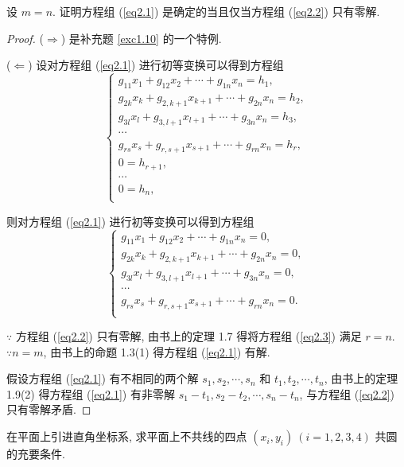 \documentclass{ctexart}
\begin{document}
\begin{exercisec}[1.11]
    设 $m=n$. 证明方程组 (\ref{eq2.1}) 是确定的当且仅当方程组 (\ref{eq2.2}) 只有零解.
\end{exercisec}
\begin{proof}
    ($\Rightarrow$) 是补充题 \ref{exc1.10} 的一个特例.

    ($\Leftarrow$) 设对方程组 (\ref{eq2.1}) 进行初等变换可以得到方程组
    \[\begin{cases}
        g_{11}x_1+g_{12}x_2+\cdots+g_{1n}x_n=h_1, \\
        g_{2k}x_k+g_{2,k+1}x_{k+1}+\cdots+g_{2n}x_n=h_2, \\
        g_{3l}x_l+g_{3,l+1}x_{l+1}+\cdots+g_{3n}x_n=h_3, \\
        \cdots \\
        g_{rs}x_s+g_{r,s+1}x_{s+1}+\cdots+g_{rn}x_n=h_r, \\
        0=h_{r+1}, \\
        \cdots \\
        0=h_n, \\
    \end{cases}\]

    则对方程组 (\ref{eq2.1}) 进行初等变换可以得到方程组
    \begin{equation}\label{eq2.3}
        \begin{cases}
            g_{11}x_1+g_{12}x_2+\cdots+g_{1n}x_n=0, \\
            g_{2k}x_k+g_{2,k+1}x_{k+1}+\cdots+g_{2n}x_n=0, \\
            g_{3l}x_l+g_{3,l+1}x_{l+1}+\cdots+g_{3n}x_n=0, \\
            \cdots \\
            g_{rs}x_s+g_{r,s+1}x_{s+1}+\cdots+g_{rn}x_n=0. \\
        \end{cases}
    \end{equation}
    
    $\because$ 方程组 (\ref{eq2.2}) 只有零解, 由书上的定理 1.7 得将方程组 (\ref{eq2.3}) 满足 $r=n$. $\because n=m$, 由书上的命题 1.3(1) 得方程组 (\ref{eq2.1}) 有解.
    
    假设方程组 (\ref{eq2.1}) 有不相同的两个解 $s_1,s_2,\cdots,s_n$ 和 $t_1,t_2,\cdots,t_n$, 由书上的定理 1.9(2) 得方程组 (\ref{eq2.1}) 有非零解 $s_1-t_1,s_2-t_2,\cdots,s_n-t_n$, 与方程组 (\ref{eq2.2}) 只有零解矛盾.
\end{proof}
\begin{exercisec}[1.15(2)]
    在平面上引进直角坐标系, 求平面上不共线的四点 $(x_i,y_i)\ (i=1,2,3,4)$ 共圆的充要条件.
\end{exercisec}
\end{document}
